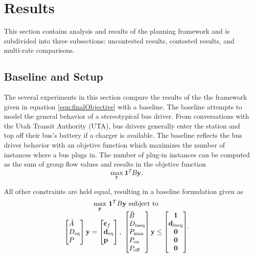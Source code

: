 \section{Results}
This section contains analysis and results of the planning framework and is subdivided into three subsections: uncontested results, contested results, and multi-rate comparisons.  
\subsection{Baseline and Setup}
The several experiments in this section compare the results of the the framework given in equation \ref{eqn:finalObjective} with a baseline. The baseline attempts to model the general behavior of a stereotypical bus driver. From conversations with the Utah Transit Authority (UTA), bus drivers generally enter the station and top off their bus's battery if a charger is available. The baseline reflects the bus driver behavior with an objetive function which maximizes the number of instances where a bus plugs in. The number of plug-in instances can be computed as the sum of group flow values and results in the objetive function
\begin{equation}
	\underset{\mathbf{y}}{\text{max}} \ \mathbf{1}^TB\mathbf{y},
\end{equation}
\par All other constraints are held equal, resulting in a baseline formulation given as
\begin{equation}\label{eqn:finalBaselineObjective}
	\begin{matrix*}[c]
		\underset{\mathbf{y}}{\scalebox{1}{\text{max}}} \ \mathbf{1}^TB\mathbf{y} \ \text{subject to}\\
		\begin{bmatrix*}[l]
				\tilde{A} \\
				D_{\text{eq}} \\
				P
				\end{bmatrix*} \mathbf{y} = \begin{bmatrix*}[l]\mathbf{c}_f \\ \mathbf{d}_{\text{eq}}\\\mathbf{p} \end{bmatrix*}, \ \begin{bmatrix*}[l]
			\tilde{B} \\
			D_{\text{ineq}} \\ 
			P_{\text{max}} \\
			P_{\text{on}} \\
			P_{\text{off}}
			\end{bmatrix*}\mathbf{y} \le \begin{bmatrix*}\mathbf{1} \\ \mathbf{d}_{\text{ineq}} \\ \mathbf{0} \\ \mathbf{0} \\ \mathbf{0} \end{bmatrix*}
	\end{matrix*}.
\end{equation}
